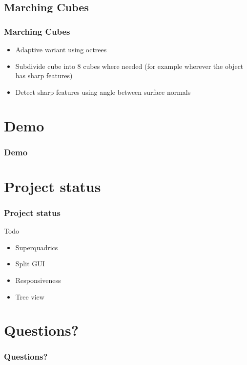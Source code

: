 \documentclass[t]{beamer}
\begin{document}
\subsection{Marching Cubes}
\begin{frame}
\frametitle{Marching Cubes}
\begin{itemize}
 \item Adaptive variant using octrees
 \item Subdivide cube into 8 cubes where needed (for example wherever
  the object has sharp features)
 \item Detect sharp features using angle between surface normals
\end{itemize}
\end{frame}

\section{Demo}
\begin{frame}
\frametitle{Demo}
\end{frame}

\section{Project status}
\begin{frame}
\frametitle{Project status}
Todo
\begin{itemize}
 \item Superquadrics
 \item Split GUI
 \item Responsiveness
 \item Tree view
\end{itemize}
\end{frame}

\section{Questions?}
\begin{frame}
\frametitle{Questions?}
\end{frame}
\end{document}
